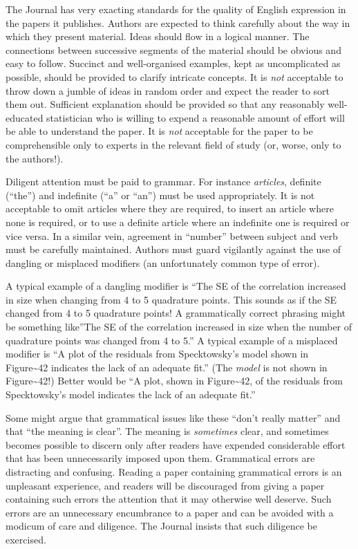 \documentclass[
  times,
  doublespace]{anzsauth}
\begin{document}
The Journal has very exacting standards for the quality of English
expression in the papers it publishes. Authors are expected to think
carefully about the way in which they present material. Ideas should
flow in a logical manner. The connections between successive segments of
the material should be obvious and easy to follow. Succinct and
well-organised examples, kept as uncomplicated as possible, should be
provided to clarify intricate concepts. It is \emph{not} acceptable to
throw down a jumble of ideas in random order and expect the reader to
sort them out. Sufficient explanation should be provided so that any
reasonably well-educated statistician who is willing to expend a
reasonable amount of effort will be able to understand the paper. It is
\emph{not} acceptable for the paper to be comprehensible only to experts
in the relevant field of study (or, worse, only to the authors!).

Diligent attention must be paid to grammar. For instance
\emph{articles}, definite (``the'') and indefinite (``a'' or ``an'')
must be used appropriately. It is not acceptable to omit articles where
they are required, to insert an article where none is required, or to
use a definite article where an indefinite one is required or vice
versa. In a similar vein, agreement in ``number'' between subject and
verb must be carefully maintained. Authors must guard vigilantly against
the use of dangling or misplaced modifiers (an unfortunately common type
of error).

A typical example of a dangling modifier is ``The SE of the correlation
increased in size when changing from 4 to 5 quadrature points. This
sounds as if the SE changed from 4 to 5 quadrature points! A
grammatically correct phrasing might be something like''The SE of the
correlation increased in size when the number of quadrature points was
changed from 4 to 5.'' A typical example of a misplaced modifier is ``A
plot of the residuals from Specktowsky's model shown in
Figure\textasciitilde42 indicates the lack of an adequate fit.'' (The
\emph{model} is not shown in Figure\textasciitilde42!) Better would be
``A plot, shown in Figure\textasciitilde42, of the residuals from
Specktowsky's model indicates the lack of an adequate fit.''

Some might argue that grammatical issues like these ``don't really
matter'' and that ``the meaning is clear''. The meaning is
\emph{sometimes} clear, and sometimes becomes possible to discern only
after readers have expended considerable effort that has been
unnecessarily imposed upon them. Grammatical errors are distracting and
confusing. Reading a paper containing grammatical errors is an
unpleasant experience, and readers will be discouraged from giving a
paper containing such errors the attention that it may otherwise well
deserve. Such errors are an unnecessary encumbrance to a paper and can
be avoided with a modicum of care and diligence. The Journal insists
that such diligence be exercised.
\end{document}

